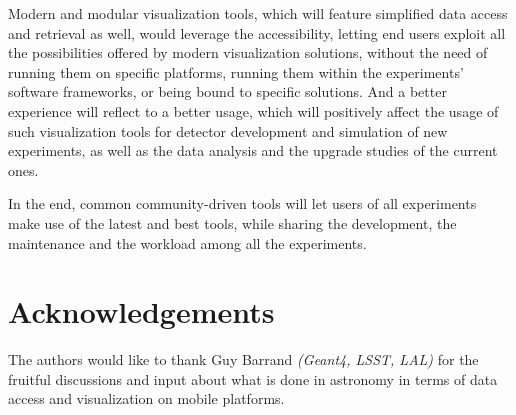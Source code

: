 \documentclass[12pt,a4paper]{article}
\begin{document}
Modern and modular visualization tools, which will feature simplified data access and retrieval as well, would leverage
the accessibility, letting end users exploit all the possibilities offered by modern visualization solutions, without the need
of running them on specific platforms, running them within the experiments’ software frameworks, or being bound to specific solutions.
And a better experience will reflect to a better usage, which will positively affect the usage of such visualization tools for
detector development and simulation of new experiments, as well as the data analysis and the upgrade studies of the current ones.

In the end, common community-driven tools will let users of all experiments make use of the latest and best tools, while sharing the development,
the maintenance and the workload among all the experiments.

\hypertarget{acknowledgements}{%
\section{Acknowledgements}\label{acknowledgements}}

The authors would like to thank Guy Barrand \textit{(Geant4, LSST, LAL)} for the fruitful discussions and input about what is done in astronomy in terms of data access and visualization on mobile platforms.




\sloppy
\raggedright
\clearpage
\printbibliography[title={References},heading=bibintoc]
\end{document}
